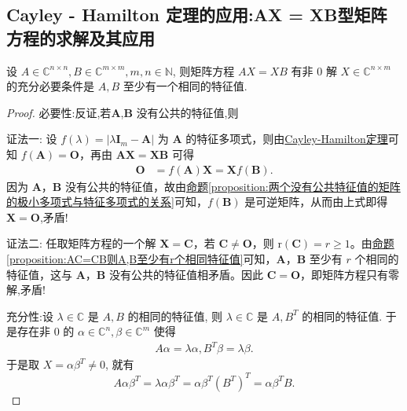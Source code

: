 \documentclass[../../main.tex]{subfiles}%
\begin{document}
\subsection{Cayley - Hamilton 定理的应用:AX = XB型矩阵方程的求解及其应用}

\begin{proposition}[$AX=XB$经典结论]\label{AX=XB相关命题1}
设 $A \in \mathbb{C}^{n \times n}, B \in \mathbb{C}^{m \times m}, m, n \in \mathbb{N}$, 则矩阵方程 $AX=XB$ 有非 $0$ 解 $X \in \mathbb{C}^{n \times m}$ 的充分必要条件是 $A, B$ 至少有一个相同的特征值.
\end{proposition}
\begin{proof}

{\heiti 必要性:}反证,若\(\boldsymbol{A}\),\(\boldsymbol{B}\) 没有公共的特征值,则

{\color{blue}证法一:}
设 \(f(\lambda)=|\lambda\boldsymbol{I}_m - \boldsymbol{A}|\) 为 \(\boldsymbol{A}\) 的特征多项式，则由\hyperref[theorem:Cayley-Hamilton定理]{Cayley-Hamilton定理}可知 \(f(\boldsymbol{A})=\boldsymbol{O}\)，再由 \(\boldsymbol{AX = XB}\) 可得
\begin{align*}
\boldsymbol{O}&=f(\boldsymbol{A})\boldsymbol{X}=\boldsymbol{X}f(\boldsymbol{B}).
\end{align*}
因为 \(\boldsymbol{A}\)，\(\boldsymbol{B}\) 没有公共的特征值，故由\hyperref[proposition:两个没有公共特征值的矩阵的极小多项式与特征多项式的关系]{命题\ref{proposition:两个没有公共特征值的矩阵的极小多项式与特征多项式的关系}}可知，\(f(\boldsymbol{B})\) 是可逆矩阵，从而由上式即得 \(\boldsymbol{X = O}\),矛盾!

{\color{blue}证法二:}
任取矩阵方程的一个解 \(\boldsymbol{X = C}\)，若 \(\boldsymbol{C\neq O}\)，则 \(\mathrm{r}(\boldsymbol{C}) = r\geqslant  1\)。由\hyperref[proposition:AC=CB则A,B至少有r个相同特征值]{命题\ref{proposition:AC=CB则A,B至少有r个相同特征值}}可知，\(\boldsymbol{A}\)，\(\boldsymbol{B}\) 至少有 \(r\) 个相同的特征值，这与 \(\boldsymbol{A}\)，\(\boldsymbol{B}\) 没有公共的特征值相矛盾。因此 \(\boldsymbol{C = O}\)，即矩阵方程只有零解,矛盾!

{\heiti 充分性:}设 $\lambda \in \mathbb{C}$ 是 $A, B$ 的相同的特征值, 则 $\lambda \in \mathbb{C}$ 是 $A, B^T$ 的相同的特征值. 于是存在非 $0$ 的 $\alpha \in \mathbb{C}^n, \beta \in \mathbb{C}^m$ 使得
\begin{align*}
A\alpha = \lambda\alpha, B^T\beta = \lambda\beta.
\end{align*}
于是取 $X = \alpha\beta^T \neq 0$, 就有
$$A\alpha\beta^T = \lambda\alpha\beta^T = \alpha\beta^T (B^T)^T = \alpha\beta^T B.$$
\end{proof}
\end{document}

